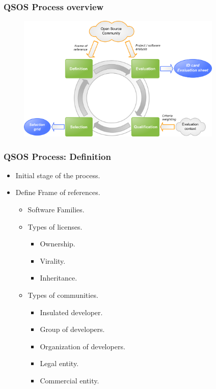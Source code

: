 \documentclass{beamer}
\begin{document}

\begin{frame}
\frametitle{QSOS Process overview}
\begin{center}
\begin{figure}
 \includegraphics[height=6cm]{figs/QSOS_Process_Overview.png}
\end{figure}
\end{center}
\end{frame}


\begin{frame}
 \frametitle{QSOS Process: Definition}
 \begin{itemize}
 \item Initial stage of the process.
 \item Define Frame of references.
   \begin{itemize}
   \item Software Families.
   \item Types of licenses.
      \begin{itemize}
      \item Ownership.
      \item Virality.
      \item Inheritance.
      \end{itemize}
   \item Types of communities.
      \begin{itemize}
      \item Insulated developer.
      \item Group of developers.
      \item Organization of developers.
      \item Legal entity.
      \item Commercial entity.
      \end{itemize}
   \end{itemize}
 \end{itemize}
\end{frame}
\end{document}
